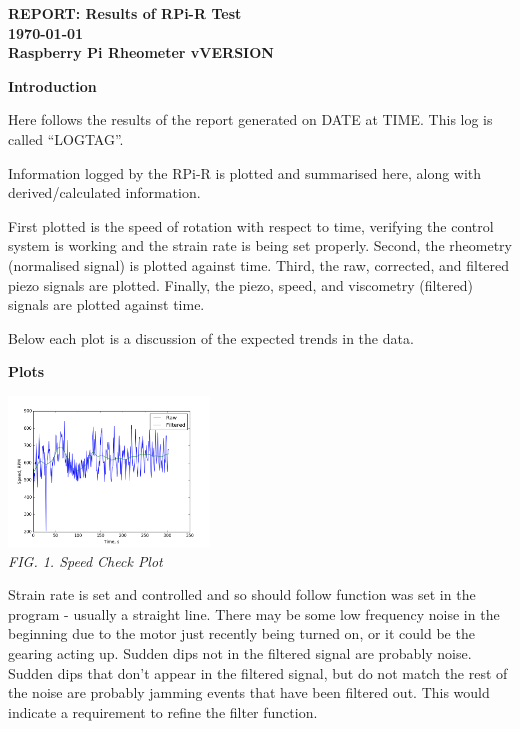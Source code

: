 \documentclass{article}
\begin{document}
	
	\twocolumn {}
	
	{\centering\Large\bfseries REPORT: \normalfont Results of RPi-R Test\\ \normalsize\today \\ Raspberry Pi Rheometer vVERSION\\}
	
	\vskip0.5cm \noindent
	{\centering\textbf{Introduction}\\}
	
	Here follows the results of the report generated on DATE at TIME. This log is called ``LOGTAG''.
	
	Information logged by the RPi-R is plotted and summarised here, along with derived/calculated information.
	
	First plotted is the speed of rotation with respect to time, verifying the control system is working and the strain rate is being set properly. Second, the rheometry (normalised signal) is plotted against time. Third, the raw, corrected, and filtered piezo signals are plotted. Finally, the piezo, speed, and viscometry (filtered) signals are plotted against time.
	
	Below each plot is a discussion of the expected trends in the data.
	
	\vskip0.25cm \noindent
	{\centering\textbf{Plots}\\}
	
	{\centering \includegraphics[width=0.4\textwidth]{strain_check.png}\\
	\textit{FIG. 1. Speed Check Plot}\\}

	Strain rate is set and controlled and so should follow function was set in the program - usually a straight line. There may be some low frequency noise in the beginning due to the motor just recently being turned on, or it could be the gearing acting up. Sudden dips not in the filtered signal are probably noise. Sudden dips that don't appear in the filtered signal, but do not match the rest of the noise are probably jamming events that have been filtered out. This would indicate a requirement to refine the filter function.
\end{document}
